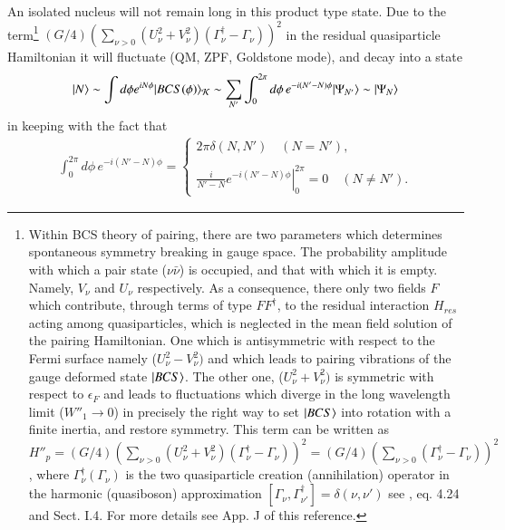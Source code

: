 An isolated nucleus will not remain long in this product type state. Due to the term\footnote{Within BCS theory of pairing, there are two parameters which determines spontaneous symmetry breaking in gauge space. The probability amplitude with which a pair state ($\nu\bar{\nu}$) is occupied, and that with which it is empty. Namely, $V_\nu$ and $U_\nu$ respectively. As a consequence, there only two fields $F$ which contribute, through terms of type $FF^\dagger$, to the residual interaction $H_{res}$ acting among quasiparticles, which is neglected in the mean field solution of the pairing Hamiltonian. One which is antisymmetric with respect to the Fermi surface namely ($U^2_\nu-V^2_\nu)$ and which leads to pairing vibrations of the gauge deformed state $|{BCS} \rangle$. The other one, ($U^2_\nu+V^2_\nu)$ is symmetric with respect to $\epsilon_F$ and leads to fluctuations which diverge in the long wavelength limit ($W''_1\to0$) in precisely the right way to set $|{BCS} \rangle$ into rotation with a finite inertia, and restore symmetry. This term can be written as $H''_p=(G/4)\left(\sum_{\nu>0}\left(U^2_\nu+V^2_\nu\right)\left(\Gamma_\nu^\dagger-\Gamma_\nu\right)\right)^2=(G/4)\left(\sum_{\nu>0}\left(\Gamma_\nu^\dagger-\Gamma_\nu\right)\right)^2$, where $\Gamma^\dagger_\nu (\Gamma_\nu)$ is the two quasiparticle creation (annihilation) operator in the harmonic (quasiboson) approximation $[\Gamma_\nu,\Gamma^{\dagger}_{\nu'}]=\delta(\nu,\nu')$ see \cite{Brink:05}, eq. 4.24 and Sect. I.4. For more details see App. J of this reference.
}  $(G/4)\left(\sum_{\nu>0}\left(U^2_\nu+V^2_\nu\right)\left(\Gamma_\nu^\dagger-\Gamma_\nu\right)\right)^2$ in the residual quasiparticle Hamiltonian it will fluctuate (QM, ZPF, Goldstone mode), and decay into a state
\begin{align}\label{eqbeta}
|N\rangle \sim \int d\phi e^{iN\phi}|BCS(\phi)\rangle_{\mathcal{K}}\sim \sum_{N'}\int_0^{2\pi}d\phi\, e^{-i(N'-N)\phi}|{\Psi_{N'}} \rangle\sim|{\Psi_{N}} \rangle
\end{align}
in keeping with the fact that
\begin{align}\label{eq3.7.27}
\int_0^{2\pi}d\phi\, e^{-i(N'-N)\phi}=\left\{
\begin{array}{c}
 2\pi\delta(N,N')\quad (N=N'),\\ 
 \\
\left.\frac{i}{N'-N}e^{-i(N'-N)\phi}\right|^{2\pi}_0=0\quad (N\neq N').
\end{array} \right.
\end{align}
